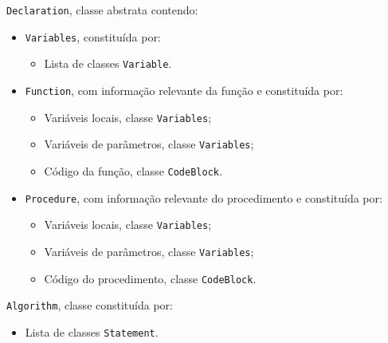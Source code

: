 \documentclass[12pt,a4paper]{report}
\begin{document}
\texttt{Declaration}, classe abstrata contendo:
\begin{itemize}
    \item \texttt{Variables}, constituída por:
    \begin{itemize}
        \item Lista de classes \texttt{Variable}.
    \end{itemize}
    \item \texttt{Function}, com informação relevante da função e constituída por:
    \begin{itemize}
        \item Variáveis locais, classe \texttt{Variables};
        \item Variáveis de parâmetros, classe \texttt{Variables};
        \item Código da função, classe \texttt{CodeBlock}.
    \end{itemize}
    \item \texttt{Procedure}, com informação relevante do procedimento e constituída por:
    \begin{itemize}
        \item Variáveis locais, classe \texttt{Variables};
        \item Variáveis de parâmetros, classe \texttt{Variables};
        \item Código do procedimento, classe \texttt{CodeBlock}.
    \end{itemize}
\end{itemize}

\vspace{5mm}

\texttt{Algorithm}, classe constituída por:
\begin{itemize}
    \item Lista de classes \texttt{Statement}.
\end{itemize}

\vspace{5mm}
\end{document}
